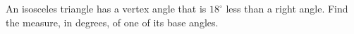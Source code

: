 An isosceles triangle has a vertex angle that is $18^\circ$ less than a right angle. Find the measure, in degrees, of one of its base angles.
